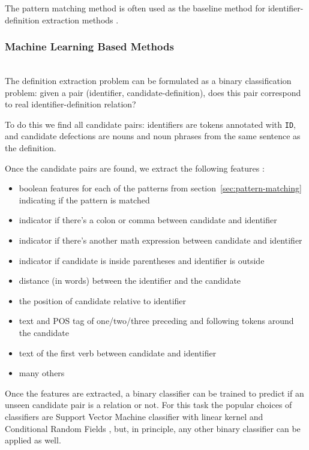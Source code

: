 The pattern matching method is often used as the baseline method 
for identifier-definition extraction methods \cite{kristianto2012extracting}
\cite{kristianto2014extracting} \cite{pagael2014mlp}.


\subsubsection{Machine Learning Based Methods}

\ \\

The definition extraction problem can be formulated as a binary classification
problem: given a pair (identifier, candidate-definition), does this pair 
correspond to real identifier-definition relation? 

To do this we find all candidate pairs: identifiers are tokens 
annotated with \texttt{ID}, and candidate defections are nouns and 
noun phrases from the same sentence as the definition. 

Once the candidate pairs are found, we extract the following features \cite{kristianto2014extracting} \cite{yokoi2011contextual}:


\begin{itemize}
\itemsep1pt\parskip0pt
  \item boolean features for each of the patterns from 
    section~\ref{sec:pattern-matching} indicating if the pattern is matched
  \item indicator if there's a colon or comma between candidate and identifier
  \item indicator if there's another math expression between candidate and identifier
  \item indicator if candidate is inside parentheses and identifier is outside
  \item distance (in words) between the identifier and the candidate
  \item the position of candidate relative to identifier
  \item text and POS tag of one/two/three preceding and following tokens around the candidate
  \item text of the first verb between candidate and identifier
  \item many others
\end{itemize}

Once the features are extracted, a binary classifier can be trained to predict
if an unseen candidate pair is a relation or not. 
For this task the popular choices of classifiers are Support Vector Machine 
classifier with linear kernel \cite{kristianto2014extracting} \cite{yokoi2011contextual}
and Conditional Random Fields \cite{kristianto2014extracting},
but, in principle, any other binary classifier can be applied 
as well.


